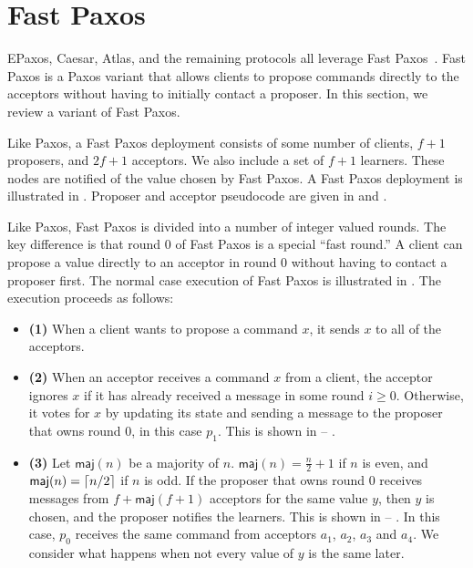 \section{Fast Paxos}
{}
{}

{}

EPaxos, Caesar, Atlas, and the remaining \BPaxos{} protocols all leverage Fast
Paxos~\cite{lamport2006fast}. Fast Paxos is a Paxos variant that allows clients
to propose commands directly to the acceptors without having to initially
contact a proposer. In this section, we review a variant of Fast Paxos.

Like Paxos, a Fast Paxos deployment consists of some number of clients, $f+1$
proposers, and $2f+1$ acceptors. We also include a set of $f+1$ learners. These
nodes are notified of the value chosen by Fast Paxos. A Fast Paxos deployment
is illustrated in . Proposer and acceptor pseudocode
are given in  and .

Like Paxos, Fast Paxos is divided into a number of integer valued rounds.  The
key difference is that round 0 of Fast Paxos is a special ``fast round.'' A
client can propose a value directly to an acceptor in round 0 without having to
contact a proposer first. The normal case execution of Fast Paxos is
illustrated in . The execution proceeds as follows:

\newcommand{\maj}[1]{\textsf{maj}(#1)}

\begin{itemize}
  \item \textbf{(1)}
    When a client wants to propose a command $x$, it sends $x$ to all of the
    acceptors.

  \item \textbf{(2)}
    When an acceptor receives a command $x$ from a client, the acceptor ignores
    $x$ if it has already received a message in some round $i \geq 0$.
    Otherwise, it votes for $x$ by updating its state and sending a
     message to the proposer that owns round $0$, in this
    case $p_1$. This is shown in 
     -- .

  \item \textbf{(3)}
    Let $\maj{n}$ be a majority of $n$. $\maj{n} = \frac{n}{2} + 1$ if $n$ is
    even, and $\maj{n} = \ceil{n/2}$ if $n$ is odd. If the proposer that owns
    round $0$ receives  messages from $f + \maj{f+1}$
    acceptors for the same value $y$, then $y$ is chosen, and the proposer
    notifies the learners. This is shown in 
     -- . In this case, $p_0$ receives
    the same command from acceptors $a_1$, $a_2$, $a_3$ and $a_4$. We consider
    what happens when not every value of $y$ is the same later.
\end{itemize}

